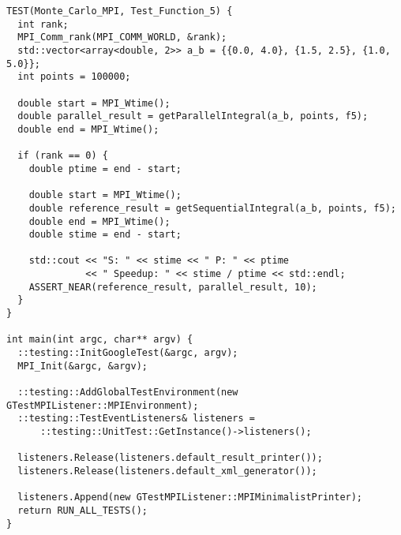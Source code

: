 \documentclass{report}
\begin{document}
\begin{lstlisting}
TEST(Monte_Carlo_MPI, Test_Function_5) {
  int rank;
  MPI_Comm_rank(MPI_COMM_WORLD, &rank);
  std::vector<array<double, 2>> a_b = {{0.0, 4.0}, {1.5, 2.5}, {1.0, 5.0}};
  int points = 100000;

  double start = MPI_Wtime();
  double parallel_result = getParallelIntegral(a_b, points, f5);
  double end = MPI_Wtime();

  if (rank == 0) {
    double ptime = end - start;

    double start = MPI_Wtime();
    double reference_result = getSequentialIntegral(a_b, points, f5);
    double end = MPI_Wtime();
    double stime = end - start;

    std::cout << "S: " << stime << " P: " << ptime
              << " Speedup: " << stime / ptime << std::endl;
    ASSERT_NEAR(reference_result, parallel_result, 10);
  }
}

int main(int argc, char** argv) {
  ::testing::InitGoogleTest(&argc, argv);
  MPI_Init(&argc, &argv);

  ::testing::AddGlobalTestEnvironment(new GTestMPIListener::MPIEnvironment);
  ::testing::TestEventListeners& listeners =
      ::testing::UnitTest::GetInstance()->listeners();

  listeners.Release(listeners.default_result_printer());
  listeners.Release(listeners.default_xml_generator());

  listeners.Append(new GTestMPIListener::MPIMinimalistPrinter);
  return RUN_ALL_TESTS();
}

\end{lstlisting}
\end{document}
